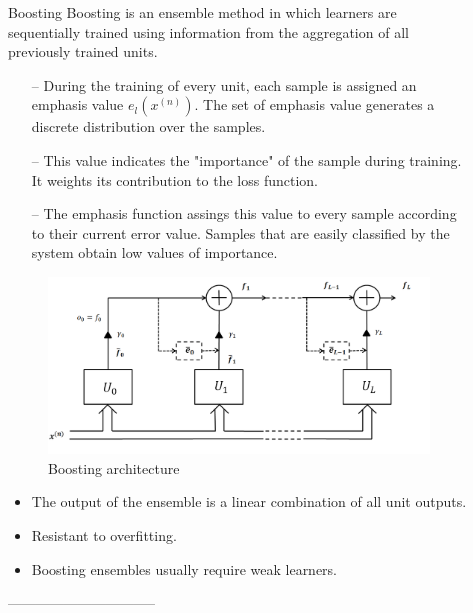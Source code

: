 \documentclass[final,hyperref={pdfpagelabels=false}]{beamer}
\begin{document}
\begin{frame}[t]
\begin{columns}[t]
\begin{column}{.465\textwidth}
\begin{block}{	Boosting}
Boosting is an ensemble method in which learners are sequentially trained using information from the aggregation of all previously trained units. 

\begin{itemize}
\setlength{\itemindent}{2em}
\item[--]  During the training of every unit, each sample is assigned an emphasis value $\mathit{e_{l}(x^{(n)})}$. The set of emphasis value generates a discrete distribution over the samples.
\item[--] This value indicates the "importance" of the sample during training. It weights its contribution to the loss function.
\item[--] The emphasis function assings this value to every sample according to their current error value. Samples that are easily classified by the system obtain low values of importance.
\end{itemize}

\centering
\begin{figure}
\includegraphics[width=0.8\linewidth]{Boost1.png}
\caption{Boosting architecture}
\end{figure}
\begin{itemize}
\setlength{\itemindent}{1em}
\item The output of the ensemble is a linear combination of all unit outputs.
\item Resistant to overfitting.
\item Boosting ensembles usually require weak learners.
\end{itemize}
\end{block}

--------------------------------
\end{column} %

\begin{column}{.03\textwidth}\end{column} %
 
\begin{column}{.465\textwidth} %


\end{column}
\end{columns}
\end{frame}
\end{document}
